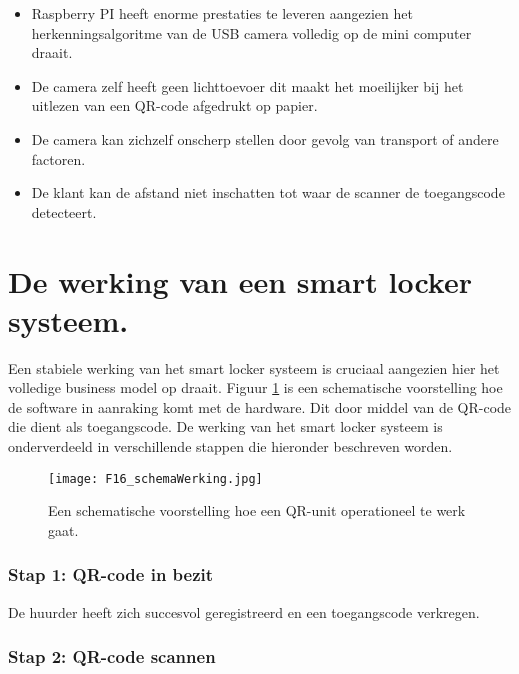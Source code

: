 \begin{itemize}
    \item Raspberry PI heeft enorme prestaties te leveren aangezien het herkenningsalgoritme van de USB camera volledig op de mini computer draait.
    \item De camera zelf heeft geen lichttoevoer dit maakt het moeilijker bij het uitlezen van een QR-code afgedrukt op papier.
    \item De camera kan zichzelf onscherp stellen door gevolg van transport of andere factoren. 
    \item De klant kan de afstand niet inschatten tot waar de scanner de toegangscode detecteert.
\end{itemize}

\section{De werking van een smart locker systeem.}%
\label{sec:WerkingUnits}

Een stabiele werking van het smart locker systeem is cruciaal aangezien hier het volledige business model op draait. Figuur \ref{fig:schemaWerkingUnit} is een schematische voorstelling hoe de software in aanraking komt met de hardware. Dit door middel van de QR-code die dient als toegangscode. De werking van het smart locker systeem is onderverdeeld in verschillende stappen die hieronder beschreven worden.

\begin{figure}[h]
    \centering
    \texttt{[image: F16\_schemaWerking.jpg]}
    \captionsetup{justification=centering}    
    \caption{Een schematische voorstelling  hoe een QR-unit operationeel te werk gaat.}
    \label{fig:schemaWerkingUnit}
\end{figure}

\subsubsection{Stap 1: QR-code in bezit}

De huurder heeft zich succesvol geregistreerd en een toegangscode verkregen. 

\subsubsection{Stap 2: QR-code scannen}


